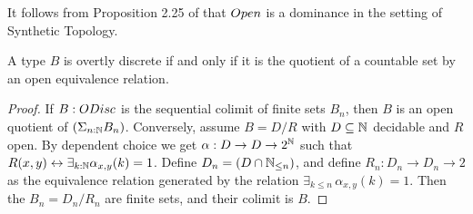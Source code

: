 \begin{remark}\label{OpenDominance}
  It follows from  Proposition 2.25 of \cite{SyntheticTopologyLesnik} that 
  $\Open$ is a dominance in the setting of Synthetic Topology. 
\end{remark}

\begin{lemma}\label{OdiscQuotientCountableByOpen}\label{ODiscEqualityOpen}
  A type $B$ is overtly discrete if and only if it is the quotient of a countable set by an open equivalence relation. 
\end{lemma}
\begin{proof}
  If $B:\ODisc$ is the sequential colimit of finite sets $B_n$, 
  then $B$ is an open quotient of $ (\Sigma_{n:\mathbb{N}} B_n)$.
%
  Conversely, assume $B= D/R$ with $D\subseteq \mathbb{N}$ decidable and $R$ open. 
  By dependent choice we get $\alpha:D \to D \to 2^{\mathbb{N}}$ such that 
  $R(x,y)\leftrightarrow \exists_{k:\mathbb{N}}\alpha_{x,y}(k) = 1$. 
  Define $D_n = (D \cap \mathbb{N}_{\leq n})$, and define $R_n : D_n \to D_n \to 2$ as the equivalence relation generated by the relation 
  $\exists_{k\leq n}\, \alpha_{x,y}(k) =1$. 
  Then the $B_n = D_n/R_n$ are finite sets, and their colimit is $B$. 
\end{proof}

